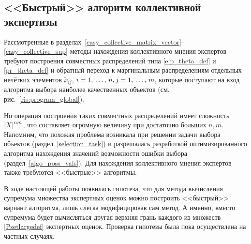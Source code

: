 \subsection{<<Быстрый>> алгоритм коллективной экспертизы }

Рассмотренные в разделах~\ref{easy_collective_matrix_vector}--\ref{easy_collective_sup} методы нахождения коллективного мнения экспертов требуют построения совместных распределений типа \eqref{e:p_theta_def} и \eqref{pr_theta_def} и обратный переход к маргинальным распределениям отдельных нечётких элементов $\tilde x_{ij}$, $i = 1,\, \ldots,\, n, j = 1,\, \ldots,\, m$, которые поступают на вход алгоритма выбора наиболее качественных объектов (см. рис.~\ref{ris:program_global}).

Но операция построения таких совместных распределений имеет сложность $\left| X \right|^{nm}$, что составляет огромную величину при достаточно больших $n, m$. Напомним, что похожая проблема возникала при решении задачи выбора объектов (раздел~\ref{selection_task}) и разрешалась разработкой оптимизированного алгоритма нахождения значений возможности ошибки выбора (раздел~\ref{algo_poss_vals}). Для нахождения коллективного мнения экспертов также требуются <<быстрые>> алгоритмы.

В ходе настоящей работы появилась гипотеза, что для метода вычисления супремума множества экспертных оценок можно построить <<быстрый>> вариант алгоритма, лишь слегка модифицировав сам метод. А именно, вместо супремума будет вычисляться другая верхняя грань каждого из множеств \eqref{Psetlargedef} экспертных оценок. Проверка гипотезы была пока осуществлена на частных случаях. 


